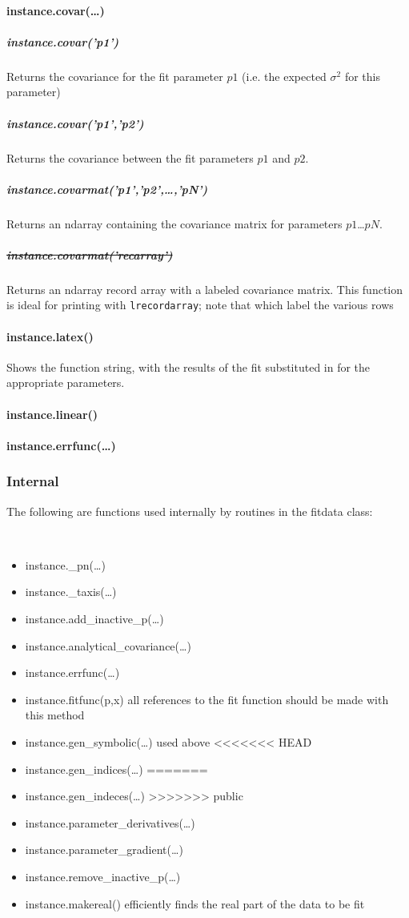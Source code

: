 \paragraph{instance.covar(\ldots)}
\subparagraph{instance.covar('p1')}
Returns the covariance for the fit parameter $p1$
    (i.e. the expected $\sigma^2$ for this parameter)
\subparagraph{instance.covar('p1','p2')}
Returns the covariance between the fit parameters $p1$ and $p2$.
\subparagraph{instance.covarmat('p1','p2',\ldots,'pN')}
Returns an ndarray containing the covariance matrix for parameters $p1$\ldots$pN$.
\subparagraph{\sout{ instance.covarmat('recarray') } }
Returns an ndarray record array with
    a labeled covariance matrix.
This function is ideal
    for printing with {\tt lrecordarray};
    note that 
    which label the various rows
\paragraph{instance.latex()}
Shows the function string,
    with the results of the fit substituted in for the
    appropriate parameters.
\paragraph{instance.linear()}
\paragraph{instance.errfunc(\ldots)}
\subsubsection{Internal}
The following are functions used internally by routines in the fitdata class:
{\tt
\begin{itemize}
    \item instance.\_pn(\ldots) 
    \item instance.\_taxis(\ldots) 
    \item instance.add\_inactive\_p(\ldots)
    \item instance.analytical\_covariance(\ldots)
    \item instance.errfunc(\ldots) 
    \item instance.fitfunc(p,x) {\rm all references to the fit function should be made with this method}
    \item instance.gen\_symbolic(\ldots)
        {\rm used above}
<<<<<<< HEAD
    \item instance.gen\_indices(\ldots)
=======
    \item instance.gen\_indeces(\ldots)
>>>>>>> public
    \item instance.parameter\_derivatives(\ldots)
    \item instance.parameter\_gradient(\ldots)
    \item instance.remove\_inactive\_p(\ldots)
    \item instance.makereal() {\rm efficiently finds the real part of the data to be fit}
\end{itemize}
}
